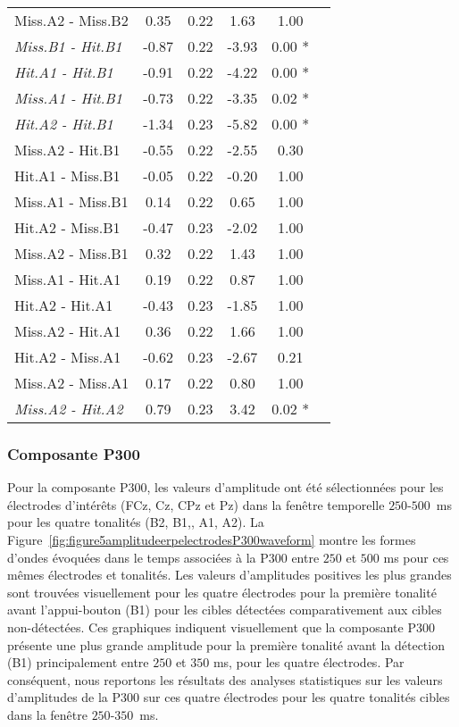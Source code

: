\begin{landscape}
\begin{table}
\begin{multicols}{4}
\begin{tabular}{|l|*{5}{c|}}
Miss.A2 - Miss.B2 & 0.35 & 0.22 & 1.63 & 1.00 \\ 
\textit{Miss.B1 - Hit.B1} & -0.87 & 0.22 & -3.93 & 0.00 * \\ 
\textit{Hit.A1 - Hit.B1} & -0.91 & 0.22 & -4.22 & 0.00 * \\ 
\textit{Miss.A1 - Hit.B1} & -0.73 & 0.22 & -3.35 & 0.02 * \\ 
\textit{Hit.A2 - Hit.B1} & -1.34 & 0.23 & -5.82 & 0.00 * \\ 
Miss.A2 - Hit.B1 & -0.55 & 0.22 & -2.55 & 0.30 \\ 
Hit.A1 - Miss.B1 & -0.05 & 0.22 & -0.20 & 1.00 \\ 
Miss.A1 - Miss.B1 & 0.14 & 0.22 & 0.65 & 1.00 \\ 
Hit.A2 - Miss.B1 & -0.47 & 0.23 & -2.02 & 1.00 \\ 
Miss.A2 - Miss.B1 & 0.32 & 0.22 & 1.43 & 1.00 \\ 
Miss.A1 - Hit.A1 & 0.19 & 0.22 & 0.87 & 1.00 \\ 
Hit.A2 - Hit.A1 & -0.43 & 0.23 & -1.85 & 1.00 \\ 
Miss.A2 - Hit.A1 & 0.36 & 0.22 & 1.66 & 1.00 \\ 
Hit.A2 - Miss.A1 & -0.62 & 0.23 & -2.67 & 0.21 \\ 
Miss.A2 - Miss.A1 & 0.17 & 0.22 & 0.80 & 1.00 \\ 
\textit{Miss.A2 - Hit.A2} & 0.79 & 0.23 & 3.42 & 0.02 * \\ 
\hline
\end{tabular}
\end{multicols}
\end{table}
\end{landscape}

\subsubsection{Composante P300}

Pour la composante P300, les valeurs d'amplitude ont été sélectionnées pour les électrodes d'intérêts (FCz, Cz, CPz et Pz) dans la fenêtre temporelle $250$-$500$~ms pour les quatre tonalités (B2, B1,, A1, A2). 
La Figure~\ref{fig:figure5amplitudeerpelectrodesP300waveform} montre les formes d'ondes évoquées dans le temps associées à la P300 entre $250$ et $500$ ms pour ces mêmes électrodes et tonalités. 
Les valeurs d'amplitudes positives les plus grandes sont trouvées visuellement pour les quatre électrodes pour la première tonalité avant l'appui-bouton (B1) pour les cibles détectées comparativement aux cibles non-détectées. 
Ces graphiques indiquent visuellement que la composante P300 présente une plus grande amplitude pour la première tonalité avant la détection (B1) principalement entre $250$ et $350$ ms, pour les quatre électrodes. 
Par conséquent, nous reportons les résultats des analyses statistiques sur les valeurs d'amplitudes de la P300 sur ces quatre électrodes pour les quatre tonalités cibles dans la fenêtre $250$-$350$~ms. 

